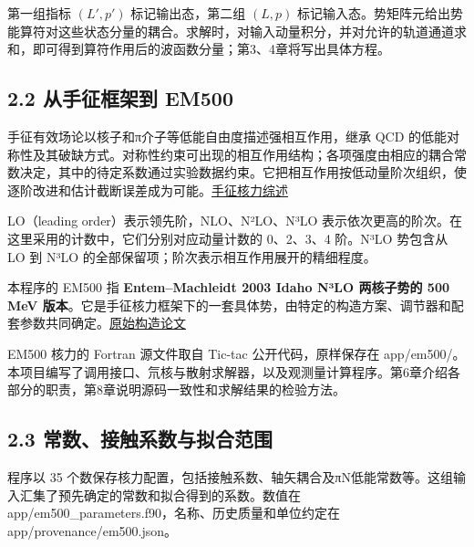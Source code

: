 \documentclass[UTF8,a4paper,zihao=5,fontset=fandol]{ctexart}
\begin{document}
第一组指标 \((L',p')\) 标记输出态，第二组 \((L,p)\) 标记输入态。势矩阵元给出势能算符对这些状态分量的耦合。求解时，对输入动量积分，并对允许的轨道通道求和，即可得到算符作用后的波函数分量；第3、4章将写出具体方程。

\subsection*{2.2 从手征框架到 EM500}
手征有效场论以核子和π介子等低能自由度描述强相互作用，继承 QCD 的低能对称性及其破缺方式。对称性约束可出现的相互作用结构；各项强度由相应的耦合常数决定，其中的待定系数通过实验数据约束。它把相互作用按低动量阶次组织，使逐阶改进和估计截断误差成为可能。\href{https://arxiv.org/abs/1105.2919}{手征核力综述}

LO（leading order）表示领先阶，NLO、N²LO、N³LO 表示依次更高的阶次。在这里采用的计数中，它们分别对应动量计数的 0、2、3、4 阶。N³LO 势包含从 LO 到 N³LO 的全部保留项；阶次表示相互作用展开的精细程度。

本程序的 EM500 指 \textbf{Entem–Machleidt 2003 Idaho N³LO 两核子势的 500 MeV 版本}。它是手征核力框架下的一套具体势，由特定的构造方案、调节器和配套参数共同确定。\href{https://arxiv.org/abs/nucl-th/0304018}{原始构造论文}

EM500 核力的 Fortran 源文件取自 Tic-tac 公开代码，原样保存在 {\ttfamily\small app/\allowbreak{}em500/\allowbreak{}}。本项目编写了调用接口、氘核与散射求解器，以及观测量计算程序。第6章介绍各部分的职责，第8章说明源码一致性和求解结果的检验方法。

\subsection*{2.3 常数、接触系数与拟合范围}
程序以 35 个数保存核力配置，包括接触系数、轴矢耦合及πN低能常数等。这组输入汇集了预先确定的常数和拟合得到的系数。数值在 {\ttfamily\small app/\allowbreak{}em500\_\allowbreak{}parameters.\allowbreak{}f90}，名称、历史质量和单位约定在 {\ttfamily\small app/\allowbreak{}provenance/\allowbreak{}em500.\allowbreak{}json}。
\end{document}
